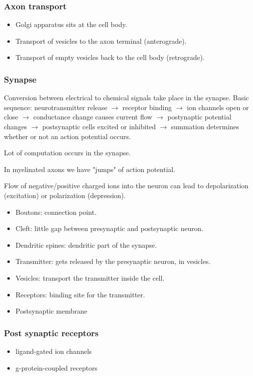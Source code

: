 \documentclass[main]{subfiles}
\begin{document}
\subsubsection{Axon transport}
\begin{itemize}[noitemsep,nolistsep]
	\item Golgi apparatus sits at the cell body.
	\item Transport of vesicles to the axon terminal (anterograde).
	\item Transport of empty vesicles back to the cell body (retrograde).
\end{itemize}

\subsubsection{Synapse}
Conversion between electrical to chemical signals take place in the synapse. Basic sequence: neurotransmitter release $\rightarrow$ receptor binding $\rightarrow$ ion channels open or close $\rightarrow$ conductance change causes current flow $\rightarrow$ postynaptic potential changes $\rightarrow$ postsynaptic cells excited or inhibited $\rightarrow$ summation determines whether or not an action potential occurs.

Lot of computation occurs in the synapse.

In myelinated axons we have "jumps" of action potential.

Flow of negative/positive charged ions into the neuron can lead to depolarization (excitation) or polarization (depression).

\begin{itemize}[noitemsep,nolistsep]
	\item Boutons: connection point.
	\item Cleft: little gap between presynaptic and postsynaptic neuron.
	\item Dendritic spines: dendritic part of the synapse.
	\item Transmitter: gets released by the presynaptic neuron, in vesicles.
	\item Vesicles: transport the transmitter inside the cell.
	\item Receptors: binding site for the transmitter.
	\item Postsynaptic membrane
\end{itemize}

\subsubsection{Post synaptic receptors}
\begin{itemize}
\item ligand-gated ion channels
\item g-protein-coupled receptors
\end{itemize}
\end{document}
